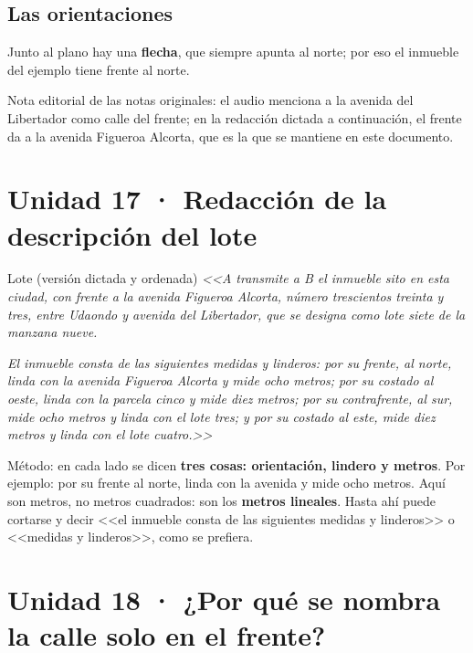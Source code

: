 \documentclass[12pt,oneside]{book}
\begin{document}
\subsection{Las orientaciones}

Junto al plano hay una \textbf{flecha}, que siempre apunta al norte; por eso el inmueble del ejemplo tiene frente al norte.

\begin{note}
Nota editorial de las notas originales: el audio menciona a la avenida del Libertador como calle del frente; en la redacción dictada a continuación, el frente da a la avenida Figueroa Alcorta, que es la que se mantiene en este documento.
\end{note}


\section{Unidad 17 · Redacción de la descripción del lote}

\begin{example}{Lote (versión dictada y ordenada)}
\textit{<<A transmite a B el inmueble sito en esta ciudad, con frente a la avenida Figueroa Alcorta, número trescientos treinta y tres, entre Udaondo y avenida del Libertador, que se designa como lote siete de la manzana nueve.}

\textit{El inmueble consta de las siguientes medidas y linderos: por su frente, al norte, linda con la avenida Figueroa Alcorta y mide ocho metros; por su costado al oeste, linda con la parcela cinco y mide diez metros; por su contrafrente, al sur, mide ocho metros y linda con el lote tres; y por su costado al este, mide diez metros y linda con el lote cuatro.>>}
\end{example}

Método: en cada lado se dicen \textbf{tres cosas: orientación, lindero y metros}. Por ejemplo: por su frente al norte, linda con la avenida y mide ocho metros. Aquí son metros, no metros cuadrados: son los \textbf{metros lineales}. Hasta ahí puede cortarse y decir <<el inmueble consta de las siguientes medidas y linderos>> o <<medidas y linderos>>, como se prefiera.

\section{Unidad 18 · ¿Por qué se nombra la calle solo en el frente?}
\end{document}
